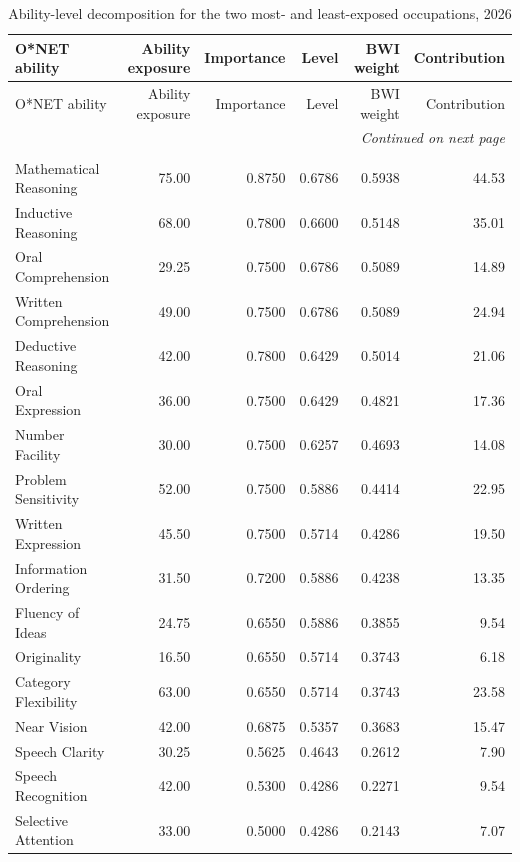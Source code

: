 \begin{longtable}{lrrrrr}
\caption{Ability-level decomposition for the two most- and least-exposed occupations, 2026}\label{tab:decomp} \\ \toprule
O*NET ability & Ability exposure & Importance & Level & BWI weight & Contribution \\ \midrule \endfirsthead
\toprule O*NET ability & Ability exposure & Importance & Level & BWI weight & Contribution \\ \midrule \endhead
\midrule \multicolumn{6}{r}{\textit{Continued on next page}} \\ \endfoot
\bottomrule \endlastfoot
\multicolumn{6}{@{}p{0.95\textwidth}@{}}{\textbf{Highest exposure: Operations Research Analysts} \hfill \textbf{Final BWI score: 43.28}}\\
\midrule
  Mathematical Reasoning & 75.00 & 0.8750 & 0.6786 & 0.5938 & 44.53 \\
  Inductive Reasoning & 68.00 & 0.7800 & 0.6600 & 0.5148 & 35.01 \\
  Oral Comprehension & 29.25 & 0.7500 & 0.6786 & 0.5089 & 14.89 \\
  Written Comprehension & 49.00 & 0.7500 & 0.6786 & 0.5089 & 24.94 \\
  Deductive Reasoning & 42.00 & 0.7800 & 0.6429 & 0.5014 & 21.06 \\
  Oral Expression & 36.00 & 0.7500 & 0.6429 & 0.4821 & 17.36 \\
  Number Facility & 30.00 & 0.7500 & 0.6257 & 0.4693 & 14.08 \\
  Problem Sensitivity & 52.00 & 0.7500 & 0.5886 & 0.4414 & 22.95 \\
  Written Expression & 45.50 & 0.7500 & 0.5714 & 0.4286 & 19.50 \\
  Information Ordering & 31.50 & 0.7200 & 0.5886 & 0.4238 & 13.35 \\
  Fluency of Ideas & 24.75 & 0.6550 & 0.5886 & 0.3855 & 9.54 \\
  Originality & 16.50 & 0.6550 & 0.5714 & 0.3743 & 6.18 \\
  Category Flexibility & 63.00 & 0.6550 & 0.5714 & 0.3743 & 23.58 \\
  Near Vision & 42.00 & 0.6875 & 0.5357 & 0.3683 & 15.47 \\
  Speech Clarity & 30.25 & 0.5625 & 0.4643 & 0.2612 & 7.90 \\
  Speech Recognition & 42.00 & 0.5300 & 0.4286 & 0.2271 & 9.54 \\
  Selective Attention & 33.00 & 0.5000 & 0.4286 & 0.2143 & 7.07 \\

\end{longtable}
